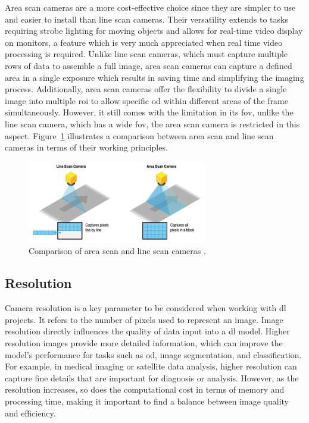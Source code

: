Area scan cameras are a more cost-effective choice since they are simpler to use and easier to install than line scan cameras. Their versatility extends to tasks requiring strobe lighting for moving objects and allows for real-time video display on monitors, a feature which is very much appreciated when real time video processing is required. Unlike line scan cameras, which must capture multiple rows of data to assemble a full image, area scan cameras can capture a defined area in a single exposure which results in saving time and simplifying the imaging process. Additionally, area scan cameras offer the flexibility to divide a single image into multiple \gls{roi} to allow specific \gls{od} within different areas of the frame simultaneously. However, it still comes with the limitation in its \gls{fov}, unlike the line scan camera, which has a wide \gls{fov}, the area scan camera is restricted in this aspect. Figure~\ref{AS_VS_LS_PIC} illustrates a comparison between area scan and line scan cameras in terms of their working principles.

\begin{figure}[h]
    \centering
    \includegraphics[width=0.7\textwidth]{Figures/Line-Scan-v-Area-Scan.png}  
    \caption{Comparison of area scan and line scan cameras \cite{AS_VS_LS_PIC}.}
    \label{AS_VS_LS_PIC}
\end{figure}


\subsection{Resolution}
Camera resolution is a key parameter to be considered when working with \gls{dl} projects. It refers to the number of pixels used to represent an image. Image resolution directly influences the quality of data input into a \gls{dl} model. Higher resolution images provide more detailed information, which can improve the model's performance for tasks such as \gls{od}, image segmentation, and classification. For example, in medical imaging or satellite data analysis, higher resolution can capture fine details that are important for diagnosis or analysis. However, as the resolution increases, so does the computational cost in terms of memory and processing time, making it important to find a balance between image quality and efficiency.

